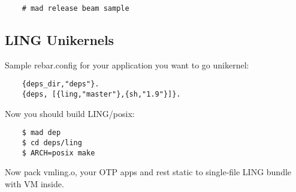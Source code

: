 \vspace{1\baselineskip}
\begin{lstlisting}
    # mad release beam sample
\end{lstlisting}
\vspace{1\baselineskip}

\subsection{LING Unikernels}

Sample rebar.config for your application you want to go unikernel:

\vspace{1\baselineskip}
\begin{lstlisting}
    {deps_dir,"deps"}.
    {deps, [{ling,"master"},{sh,"1.9"}]}.
\end{lstlisting}
\vspace{1\baselineskip}

Now you should build LING/posix:

\vspace{1\baselineskip}
\begin{lstlisting}
    $ mad dep
    $ cd deps/ling
    $ ARCH=posix make
\end{lstlisting}
\vspace{1\baselineskip}

Now pack vmling.o, your OTP apps and rest static to single-file LING bundle with VM inside.

